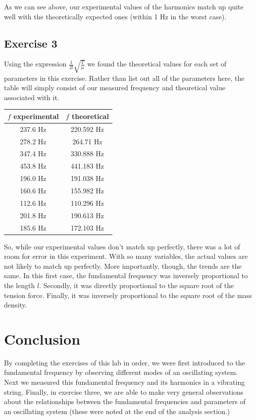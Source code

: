 \documentclass[a4paper,12pt]{article}
\begin{document}
\vspace{0.5cm}

As we can see above, our experimental values of the harmonics match up
quite well with the theoretically expected ones (within 1 Hz in the
worst case).

\subsection{Exercise 3}
Using the expression $\frac{1}{2l}\sqrt{\frac{T}{\mu}}$ we found the
theoretical values for each set of parameters in this exercise. Rather
than list out all of the parameters here, the table will simply
consist of our measured frequency and theoretical value associated
with it.

\vspace{0.5cm}

\begin{tabular}{c | c}
  $f$ experimental & $f$ theoretical \\
  \hline
  237.6 Hz & 220.592 Hz\\
  278.2 Hz & 264.71 Hz\\
  347.4 Hz & 330.888 Hz\\
  453.8 Hz & 441.183 Hz\\
  \hline 
  196.0 Hz & 191.038 Hz\\
  160.6 Hz & 155.982 Hz\\
  112.6 Hz & 110.296 Hz\\
  \hline
  201.8 Hz & 190.613 Hz\\
  185.6 Hz & 172.103 Hz\\
\end{tabular}

\vspace{0.5cm}

So, while our experimental values don't match up perfectly, there was
a lot of room for error in this experiment. With so many variables,
the actual values are not likely to match up perfectly. More
importantly, though, the trends are the same. In this first case, the
fundamental frequency was inversely proportional to the length
$l$. Secondly, it was directly proportional to the square root of the
tension force. Finally, it was inversely proportional to the square
root of the mass density. 

\section{Conclusion}
By completing the exercises of this lab in order, we were first
introduced to the fundamental frequency by observing different modes
of an oscillating system. Next we measured this fundamental frequency
and its harmonics in a vibrating string. Finally, in exercise three,
we are able to make very general observations about the relationships
between the fundamental frequencies and parameters of an oscillating
system (these were noted at the end of the analysis section.) 
\end{document}
